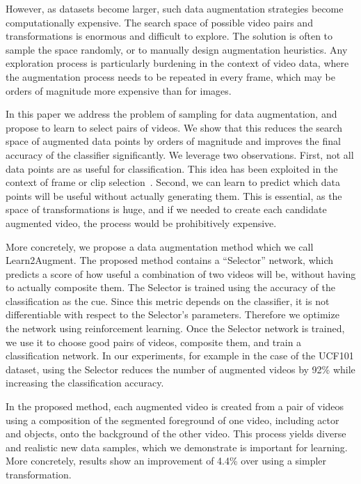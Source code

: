 \documentclass[runningheads]{llncs}
\newcommand{\Method}{Learn2Augment\xspace}
\begin{document}
However, as datasets become larger, such data augmentation strategies become computationally expensive. The search space of possible video pairs and transformations is enormous and difficult to explore. The solution is often to sample the space randomly, or to manually design augmentation heuristics. Any exploration process is particularly burdening in the context of video data, where the augmentation process needs to be repeated in every frame, which may be orders of magnitude more expensive than for images. 

In this paper we address the problem of sampling for data augmentation, and propose to learn to select pairs of videos. We show that this reduces the search space of augmented data points by orders of magnitude and improves the final accuracy of the classifier significantly. We leverage two observations. First, not all data points are as useful for classification. This idea has been exploited in the context of frame or clip selection~\cite{smart,korbar2019scsampler,whatmakes}. Second, we can learn to predict which data points will be useful without actually generating them. This is essential, as the space of transformations is huge, and if we needed to create each candidate augmented video, the process would be prohibitively expensive. 






More concretely, we propose a data augmentation method which we call \Method. The proposed method contains a ``Selector'' network, which predicts a score of how useful a combination of two videos will be, without having to actually composite them. The Selector is trained using the accuracy of the classification as the cue. Since this metric depends on the classifier, it is not differentiable with respect to the Selector's parameters. Therefore we optimize the network using reinforcement learning. Once the Selector network is trained, we use it to choose good pairs of videos, composite them, and train a classification network. In our experiments, for example in the case of the UCF101 dataset, using the Selector reduces the number of augmented videos by 92\% while increasing the classification accuracy. 

In the proposed method, each augmented video is created from a pair of videos using a composition of the segmented foreground of one video, including actor and objects, onto the background of the other video. This process yields diverse and realistic new data samples, which we demonstrate is important for learning. More concretely, results show an improvement of 4.4\% over using a simpler transformation. 
\end{document}
